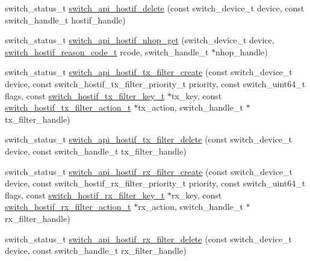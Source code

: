 \begin{DoxyCompactItemize}
\item 
switch\+\_\+status\+\_\+t \hyperlink{group__HostInterface_gaf0f5a97b3319e353f2b9ee7f8c132cc7}{switch\+\_\+api\+\_\+hostif\+\_\+delete} (const switch\+\_\+device\+\_\+t device, const switch\+\_\+handle\+\_\+t hostif\+\_\+handle)
\item 
switch\+\_\+status\+\_\+t \hyperlink{group__HostInterface_ga75452d6fe80774f25eefb57b474dd4c3}{switch\+\_\+api\+\_\+hostif\+\_\+nhop\+\_\+get} (switch\+\_\+device\+\_\+t device, \hyperlink{group__HostInterface_gab8b13524888d4f506357fae04c44babc}{switch\+\_\+hostif\+\_\+reason\+\_\+code\+\_\+t} rcode, switch\+\_\+handle\+\_\+t $\ast$nhop\+\_\+handle)
\item 
switch\+\_\+status\+\_\+t \hyperlink{group__HostInterface_gae8eecc6f092995ced289b55b6cafb994}{switch\+\_\+api\+\_\+hostif\+\_\+tx\+\_\+filter\+\_\+create} (const switch\+\_\+device\+\_\+t device, const switch\+\_\+hostif\+\_\+tx\+\_\+filter\+\_\+priority\+\_\+t priority, const switch\+\_\+uint64\+\_\+t flags, const \hyperlink{group__HostInterface_gabae602b7028818087fe7f1c9b8d02c34}{switch\+\_\+hostif\+\_\+tx\+\_\+filter\+\_\+key\+\_\+t} $\ast$tx\+\_\+key, const \hyperlink{group__HostInterface_ga294bb3f6e4fd80c02ca1c80acf11422c}{switch\+\_\+hostif\+\_\+tx\+\_\+filter\+\_\+action\+\_\+t} $\ast$tx\+\_\+action, switch\+\_\+handle\+\_\+t $\ast$tx\+\_\+filter\+\_\+handle)
\item 
switch\+\_\+status\+\_\+t \hyperlink{group__HostInterface_ga85f3010a1279ac7b4b2b1cb5dfe865f1}{switch\+\_\+api\+\_\+hostif\+\_\+tx\+\_\+filter\+\_\+delete} (const switch\+\_\+device\+\_\+t device, const switch\+\_\+handle\+\_\+t tx\+\_\+filter\+\_\+handle)
\item 
switch\+\_\+status\+\_\+t \hyperlink{group__HostInterface_ga9e27da5dbe1173fd99fc4e2504cb0ffe}{switch\+\_\+api\+\_\+hostif\+\_\+rx\+\_\+filter\+\_\+create} (const switch\+\_\+device\+\_\+t device, const switch\+\_\+hostif\+\_\+rx\+\_\+filter\+\_\+priority\+\_\+t priority, const switch\+\_\+uint64\+\_\+t flags, const \hyperlink{group__HostInterface_ga10a6365e0fb5dfe061e099c366131070}{switch\+\_\+hostif\+\_\+rx\+\_\+filter\+\_\+key\+\_\+t} $\ast$rx\+\_\+key, const \hyperlink{group__HostInterface_gae246494c29a7bbbbec6d51554108d01b}{switch\+\_\+hostif\+\_\+rx\+\_\+filter\+\_\+action\+\_\+t} $\ast$rx\+\_\+action, switch\+\_\+handle\+\_\+t $\ast$rx\+\_\+filter\+\_\+handle)
\item 
switch\+\_\+status\+\_\+t \hyperlink{group__HostInterface_gacf3edf1e21747ebc8cbba91210c1b4d4}{switch\+\_\+api\+\_\+hostif\+\_\+rx\+\_\+filter\+\_\+delete} (const switch\+\_\+device\+\_\+t device, const switch\+\_\+handle\+\_\+t rx\+\_\+filter\+\_\+handle)

\end{DoxyCompactItemize}
